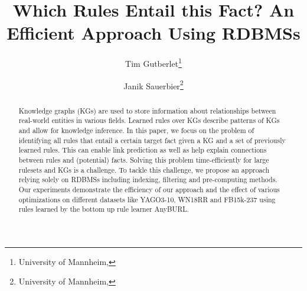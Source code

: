 \documentclass[english]{lni}
\begin{document}
\title[Which Rules Entail this Fact? - An Efficient Approach Using RDBMSs]{Which Rules Entail this Fact? \newline An Efficient Approach Using RDBMSs}
\author[Tim Gutberlet \and Janik Sauerbier]
{Tim Gutberlet\footnote{University of Mannheim, } \and
Janik Sauerbier\footnote{University of Mannheim, }}
\maketitle

\begin{abstract}
Knowledge graphs (KGs) are used to store information about relationships between real-world entities in various fields. Learned rules over KGs describe patterns of KGs and allow for knowledge inference. In this paper, we focus on the problem of identifying all rules that entail a certain target fact given a KG and a set of previously learned rules. This can enable link prediction as well as help explain connections between rules and (potential) facts. Solving this problem time-efficiently for large rulesets and KGs is a challenge. To tackle this challenge, we propose an approach relying solely on RDBMSs including indexing, filtering and pre-computing methods. Our experiments demonstrate the efficiency of our approach and the effect of various optimizations on different datasets like YAGO3-10, WN18RR and FB15k-237 using rules learned by the bottom up rule learner AnyBURL. 
 
\end{abstract}
\end{document}

